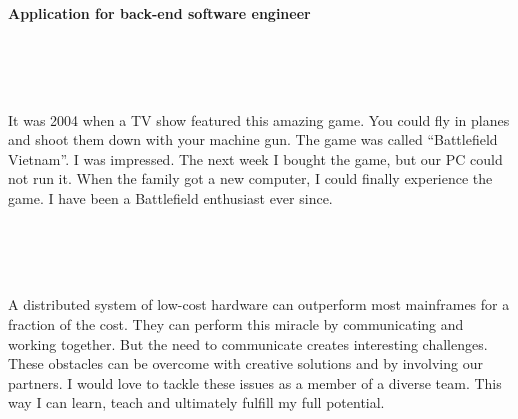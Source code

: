 \documentclass[10pt,a4paper,arial]{moderncv}        %
\begin{document}
\date{2017-05-01}

\makelettertitle

~\\
~\\

\textbf {Application for back-end software engineer}

~\\
~\\
~

It was 2004 when a TV show featured this amazing game. You could fly in planes and shoot them down with your machine gun. The game was
called ``Battlefield Vietnam''. I was impressed. The next week I bought the game, but our PC could not run it.
When the family got a new computer, I could finally experience the game. I have been a Battlefield enthusiast ever since.

~\\
~\\
~

A distributed system of low-cost hardware can outperform most mainframes for a fraction of the cost.
They can perform this miracle by communicating and working together. But the need to communicate creates interesting challenges.
These obstacles can be overcome with creative solutions and by involving our partners. I would love to tackle these issues
as a member of a diverse team. This way I can learn, teach and ultimately fulfill my full potential.


\end{document}
